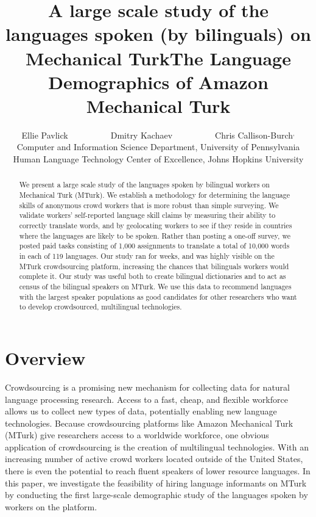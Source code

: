 \documentclass[11pt]{article}
\title{A large scale study of the languages spoken (by bilinguals) on Mechanical Turk}
\title{The Language Demographics of  Amazon Mechanical Turk}
\author{Ellie Pavlick\affliationPenn \ \ \ \ \ \ \ \ \ \ Dmitry Kachaev\affliationJHU \ \ \ \ \ \ \ \ \ \  Chris Callison-Burch\affliationPenn$^{,}$\affliationJHU \\
\affliationPenn Computer and Information Science Department, University of Pennsylvania \\
\affliationJHU Human Language Technology Center of Excellence, Johns Hopkins University \\
  }
\author{}
\date{}
\begin{document}
\maketitle

\begin{abstract}
We present a large scale study of the languages spoken by bilingual workers on Mechanical Turk (MTurk).  
We establish a  methodology for determining the language skills of anonymous crowd workers that is more robust than simple surveying.  We validate workers' self-reported language skill claims by measuring their ability to correctly translate words, and by geolocating workers to see if they reside in countries where the languages are likely to be spoken. Rather than posting a one-off survey, we posted paid tasks consisting of 1,000 assignments to translate a total of 10,000 words in each of 119 languages.  Our study ran for weeks, and was highly visible on the MTurk crowdsourcing platform, increasing the chances that bilinguals workers would complete it.  Our study was useful both to create bilingual dictionaries and to act as census of the bilingual speakers on MTurk.  We use this data to recommend languages with the largest speaker populations as good candidates for other researchers who want to  develop crowdsourced, multilingual technologies.

\end{abstract}

\section{Overview}
Crowdsourcing is a promising new mechanism for collecting data for natural language processing research. Access to a fast, cheap, and flexible workforce allows us to collect new types of data, potentially enabling new language technologies.
Because crowdsourcing platforms like Amazon Mechanical Turk (MTurk) give researchers access to a worldwide workforce, one obvious application of crowdsourcing is the creation of multilingual technologies. 
With an increasing number of active crowd workers located outside of the United States, there is even the potential to reach fluent speakers of lower resource languages.
In this paper, we investigate the feasibility of hiring language informants on MTurk by conducting the first large-scale demographic study of the languages spoken by workers on the platform. 
\end{document}
